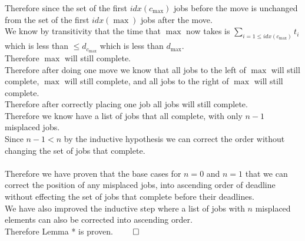 \documentclass{article}
\begin{document}
        Therefore since the set of the first $idx(c_{\max})$ jobs before the move is unchanged from the set of the first $idx(\max)$ jobs after the move. \\
        We know by transitivity that the time that $\max$ now takes is $\sum_{i = 1 \leq idx(c_{\max})} t_{i}$ which is less than  $\leq d_{c_{\max}}$ which is less than $d_{\max}$. \\
        Therefore $\max$ will still complete.\\
        Therefore after doing one move we know that all jobs to the left of $\max$ will still complete, $\max$ will still complete, and all jobs to the right of $\max$ will still complete.\\
        Therefore after correctly placing one job all jobs will still complete. \\
        Therefore we know have a list of jobs that all complete, with only $n - 1$ misplaced jobs. \\
        Since $n - 1 < n$ by the inductive hypothesis we can correct the order without changing the set of jobs that complete.\\
        \\
        Therefore we have proven that the base cases for $n = 0$ and $n = 1$ that we can correct the position of any misplaced jobs, into ascending order of deadline without effecting the set of jobs that complete before their deadlines. \\
        We have also improved the inductive step where a list of jobs with $n$ misplaced elements can also be corrected into ascending order. \\
        Therefore Lemma * is proven. $\qed$
\end{document}
